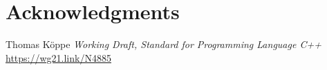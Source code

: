 \documentclass{wg21}
\begin{document}
\section{Acknowledgments}





\renewcommand{\section}[2]{}%
\begin{thebibliography}{9}

Thomas Köppe
\emph{Working Draft, Standard for Programming Language C++}\newline
\url{https://wg21.link/N4885}

\end{thebibliography}
\end{document}
